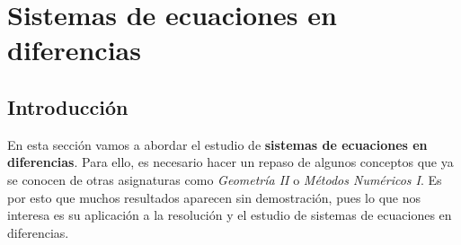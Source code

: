 \documentclass[11pt, a4paper]{article}
\newif\IfInSansMode
\numberwithin{equation}{section}
\theoremstyle{theorem-style}
\theoremstyle{definition-style}
\theoremstyle{remark-style}
\theoremstyle{example-style}
\begin{document}
\newpage





\section{Sistemas de ecuaciones en diferencias}

\subsection{Introducción}

En esta sección vamos a abordar el estudio de \textbf{sistemas de ecuaciones en diferencias}. Para ello, es necesario hacer un repaso de algunos conceptos que ya se conocen de otras asignaturas como \textit{Geometría II} o \textit{Métodos
  Numéricos I}. Es por esto que muchos resultados aparecen sin demostración, pues lo que nos interesa es su aplicación a la resolución y el estudio de sistemas de ecuaciones en diferencias.
\end{document}
